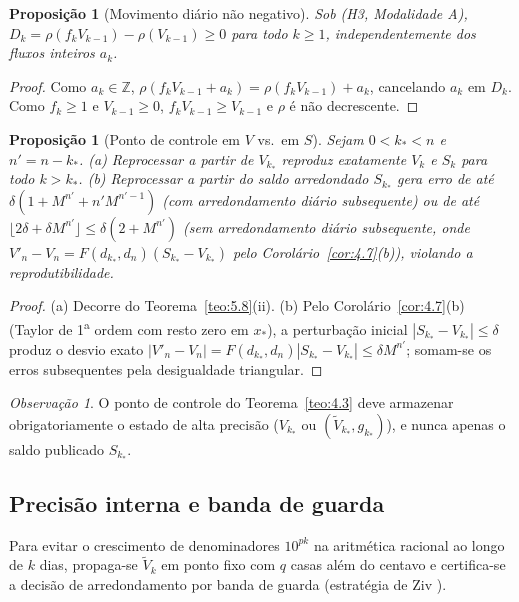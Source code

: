 \documentclass[11pt, a4paper]{article}
\theoremstyle{definition}
\theoremstyle{plain}
\newtheorem{proposicao}[definicao]{Proposição}
\theoremstyle{remark}
\newtheorem{observacao}[definicao]{Observação}
\begin{document}
\begin{proposicao}[Movimento diário não negativo]\label{prop:5.10}
Sob (H3, Modalidade A), $D_k = \rho(f_k V_{k-1}) - \rho(V_{k-1}) \ge 0$ para todo $k \ge 1$, independentemente dos fluxos inteiros $a_k$.
\end{proposicao}
\begin{proof}
Como $a_k \in \mathbb{Z}$, $\rho(f_k V_{k-1} + a_k) = \rho(f_k V_{k-1}) + a_k$, cancelando $a_k$ em $D_k$. Como $f_k \ge 1$ e $V_{k-1} \ge 0$, $f_k V_{k-1} \ge V_{k-1}$ e $\rho$ é não decrescente.
\end{proof}

\begin{proposicao}[Ponto de controle em $V$ vs.\ em $S$]\label{prop:5.11}
Sejam $0 < k_* < n$ e $n' = n - k_*$. (a) Reprocessar a partir de $V_{k_*}$ reproduz exatamente $V_k$ e $S_k$ para todo $k > k_*$. (b) Reprocessar a partir do saldo arredondado $S_{k_*}$ gera erro de até $\delta(1 + M^{n'} + n' M^{n'-1})$ (com arredondamento diário subsequente) ou de até $\lfloor 2\delta + \delta M^{n'} \rfloor \le \delta(2 + M^{n'})$ (sem arredondamento diário subsequente, onde $V'_n - V_n = F(d_{k_*}, d_n)(S_{k_*} - V_{k_*})$ pelo Corolário~\ref{cor:4.7}(b)), violando a reprodutibilidade.
\end{proposicao}
\begin{proof}
(a) Decorre do Teorema~\ref{teo:5.8}(ii). (b) Pelo Corolário~\ref{cor:4.7}(b) (Taylor de 1\textsuperscript{a} ordem com resto zero em $x_*$), a perturbação inicial $|S_{k_*} - V_{k_*}| \le \delta$ produz o desvio exato $|V'_n - V_n| = F(d_{k_*}, d_n)|S_{k_*} - V_{k_*}| \le \delta M^{n'}$; somam-se os erros subsequentes pela desigualdade triangular.
\end{proof}

\begin{observacao}\label{obs:5.12}
O ponto de controle do Teorema~\ref{teo:4.3} deve armazenar obrigatoriamente o estado de alta precisão ($V_{k_*}$ ou $(\tilde{V}_{k_*}, g_{k_*})$), e nunca apenas o saldo publicado $S_{k_*}$.
\end{observacao}

\subsection{Precisão interna e banda de guarda}\label{sec:5.4}

Para evitar o crescimento de denominadores $10^{pk}$ na aritmética racional ao longo de $k$ dias, propaga-se $\tilde{V}_k$ em ponto fixo com $q$ casas além do centavo e certifica-se a decisão de arredondamento por banda de guarda (estratégia de Ziv \cite{Ziv1991, Muller2018}).
\end{document}
